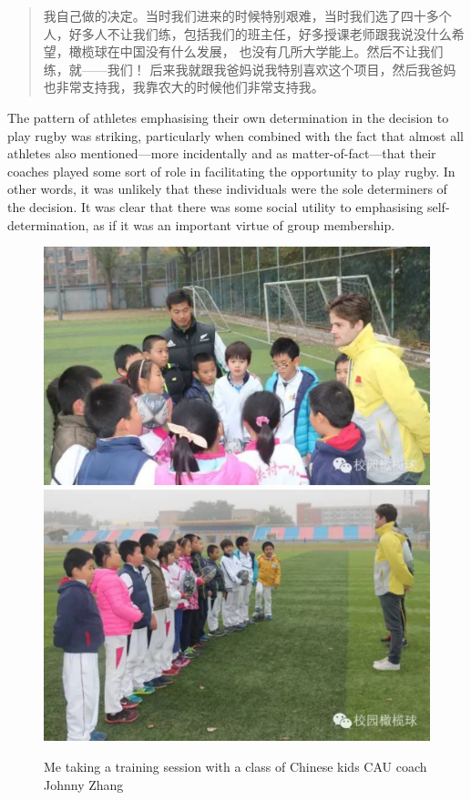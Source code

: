 \begin{CJK}{UTF8}{gbsn}
    \begin{quotation}
      我自己做的决定。当时我们进来的时候特别艰难，当时我们选了四十多个人，好多人不让我们练，包括我们的班主任，好多授课老师跟我说没什么希望，橄榄球在中国没有什么发展， 也没有几所大学能上。然后不让我们练，就——我们！ 后来我就跟我爸妈说我特别喜欢这个项目，然后我爸妈也非常支持我，我靠农大的时候他们非常支持我。
    \end{quotation}


The pattern of athletes emphasising their own determination in the decision to play rugby was striking, particularly when combined with the fact that almost all athletes also mentioned---more incidentally and as matter-of-fact---that their coaches played some sort of role in facilitating the opportunity to play rugby.  In other words, it was unlikely that these individuals were the sole determiners of the decision.  It was clear that there was some social utility to emphasising self-determination, as if it was an important virtue of group membership.


\begin{figure}[htbp]
  \begin{center}
    \includegraphics[scale=.5]{images/johnnyZhangKids.pdf}
    \includegraphics[scale=.5]{images/johnnyZhangKids1.pdf}
      \caption{Me taking a training session with a class of Chinese kids CAU coach Johnny Zhang}
        \label{fig:johnnyZhangKids}
   \end{center}
\end{figure}


\end{CJK}
